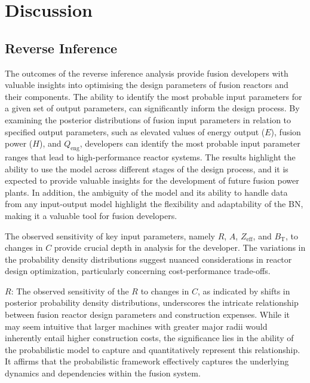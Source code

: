 \documentclass[journal]{IEEEtran}
\begin{document}
\section{Discussion}\label{sec:Discussion}


\subsection{Reverse Inference}\label{sec:disc_reverse}

The outcomes of the reverse inference analysis provide fusion developers with valuable insights into optimising the design parameters of fusion reactors and their components. The ability to identify the most probable input parameters for a given set of output parameters, can significantly inform the design process. By examining the posterior distributions of fusion input parameters in relation to specified output parameters, such as elevated values of energy output ($E$), fusion power ($H$), and $Q_{\text{eng}}$, developers can identify the most probable input parameter ranges that lead to high-performance reactor systems. The results highlight the ability to use the model across different stages of the design process, and it is expected to provide valuable insights for the development of future fusion power plants. In addition, the ambiguity of the model and its ability to handle data from any input-output model highlight the flexibility and adaptability of the BN, making it a valuable tool for fusion developers.

The observed sensitivity of key input parameters, namely $R$, $A$, $Z_{\text{eff}}$, and $B_{\text{T}}$, to changes in $C$ provide crucial depth in analysis for the developer. The variations in the probability density distributions suggest nuanced considerations in reactor design optimization, particularly concerning cost-performance trade-offs. 

\textbf{$R$}: The observed sensitivity of the $R$ to changes in $C$, as indicated by shifts in posterior probability density distributions, underscores the intricate relationship between fusion reactor design parameters and construction expenses. While it may seem intuitive that larger machines with greater major radii would inherently entail higher construction costs, the significance lies in the ability of the probabilistic model to capture and quantitatively represent this relationship. It affirms that the probabilistic framework effectively captures the underlying dynamics and dependencies within the fusion system. 
\end{document}
